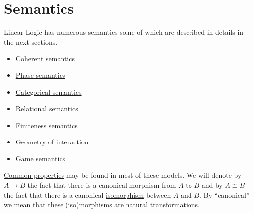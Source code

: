 \chapter{Semantics}\label{semantics}

Linear Logic has numerous semantics some of which are described in
details in the next sections.

\begin{itemize}
\item \hyperref[coherent-semantics]{Coherent semantics}
\item \hyperref[phase-semantics]{Phase semantics}
\item \hyperref[categorical-semantics]{Categorical semantics}
\item \hyperref[relational-semantics]{Relational semantics}
\item \hyperref[finiteness-semantics]{Finiteness semantics}
\item \hyperref[geometry-of-interaction]{Geometry of interaction}
\item \hyperref[game-semantics]{Game semantics}
\end{itemize}

\hyperref[provable-formulas]{Common properties} may be found in most of
these models. We will denote by \(A\longrightarrow B\) the fact that
there is a canonical morphism from \(A\) to \(B\) and by \(A\cong B\)
the fact that there is a canonical \hyperref[isomorphism]{isomorphism} between \(A\) and \(B\). By ``canonical'' we mean that these (iso)morphisms are natural
transformations.


